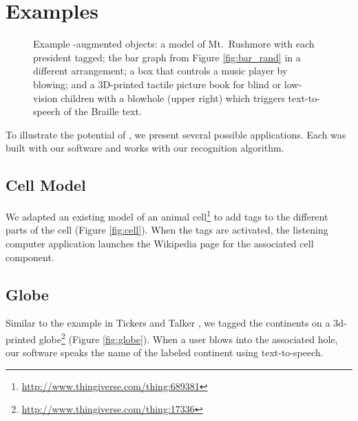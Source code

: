   \section{Examples}
    \begin{figure*}
        \centering
        \caption{Example \bh-augmented objects: \protect{} a
          model of Mt.~Rushmore with each president tagged;
          \protect{} the bar graph from Figure
          \ref{fig:bar_rand} in a different arrangement;
          \protect{} a box that controls a music player by
          blowing; and \protect{} a 3D-printed tactile
          picture book for blind or low-vision children with a blowhole (upper
          right) which triggers text-to-speech of the Braille text.}
        \label{fig:blowhole_demo2}
    \end{figure*}

    To illustrate the potential of \bh, we present several possible
    applications. Each was built with our software and works with our
    recognition algorithm.
    
    \subsection{Cell Model} 
      We adapted an existing model of an animal
      cell\footnote{\url{http://www.thingiverse.com/thing:689381}} to add \bh
      tags to the different parts of the cell (Figure \ref{fig:cell}). When the
      tags are activated, the listening computer application launches the
      Wikipedia page for the associated cell component.
        
    \subsection{Globe} 
      Similar to the example in Tickers and Talker \cite{Shi:2016ff}, we tagged
      the continents on a 3d-printed
      globe\footnote{\url{http://www.thingiverse.com/thing:17336}} (Figure
      \ref{fig:globe}). When a user blows into the associated hole, our software
      speaks the name of the labeled continent using text-to-speech. 
    
